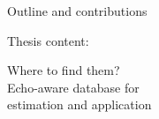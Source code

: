 \begin{frame}{Outline and contributions}
\begin{block}{Thesis content:}
    \begin{center}
        \alert{Where to find them?}
        \\Echo-aware database for
        \\estimation and application
    \end{center}
    \end{block}
\end{frame}
